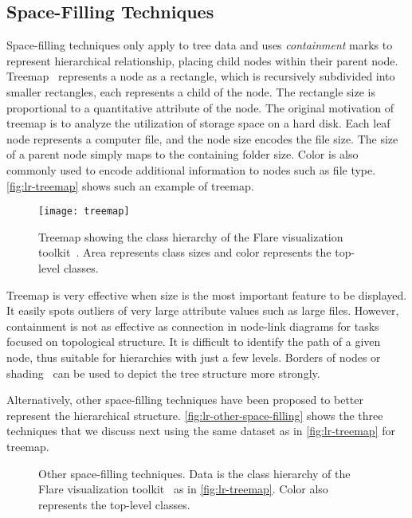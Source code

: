 \subsection{Space-Filling Techniques}
Space-filling techniques only apply to tree data and uses \emph{containment} marks to represent hierarchical relationship, placing child nodes within their parent node. Treemap~\cite{Shneiderman1992} represents a node as a rectangle, which is recursively subdivided into smaller rectangles, each represents a child of the node. The rectangle size is proportional to a quantitative attribute of the node. The original motivation of treemap is to analyze the utilization of storage space on a hard disk. Each leaf node represents a computer file, and the node size encodes the file size. The size of a parent node simply maps to the containing folder size. Color is also commonly used to encode additional information to nodes such as file type. \autoref{fig:lr-treemap} shows such an example of treemap.

\begin{figure}[!htb]
	\centering
	\texttt{[image: treemap]}
	\caption{Treemap showing the class hierarchy of the Flare visualization toolkit~\cite{Heer2009b}. Area represents class sizes and color represents the top-level classes.}
	\label{fig:lr-treemap}
\end{figure}

Treemap is very effective when size is the most important feature to be displayed. It easily spots outliers of very large attribute values such as large files. However, containment is not as effective as connection in node-link diagrams for tasks focused on topological structure. It is difficult to identify the path of a given node, thus suitable for hierarchies with just a few levels. Borders of nodes or shading~\cite{Wijk1999} can be used to depict the tree structure more strongly.

Alternatively, other space-filling techniques have been proposed to better represent the hierarchical structure. \autoref{fig:lr-other-space-filling} shows the three techniques that we discuss next using the same dataset as in \autoref{fig:lr-treemap} for treemap. 

\begin{figure}[!htb]
	\centering
	\hfill
	
	\vspace{.5\baselineskip}
	
	\caption{Other space-filling techniques. Data is the class hierarchy of the Flare visualization toolkit~\cite{Heer2009b} as in \autoref{fig:lr-treemap}. Color also represents the top-level classes.}
	\label{fig:lr-other-space-filling}
\end{figure}

